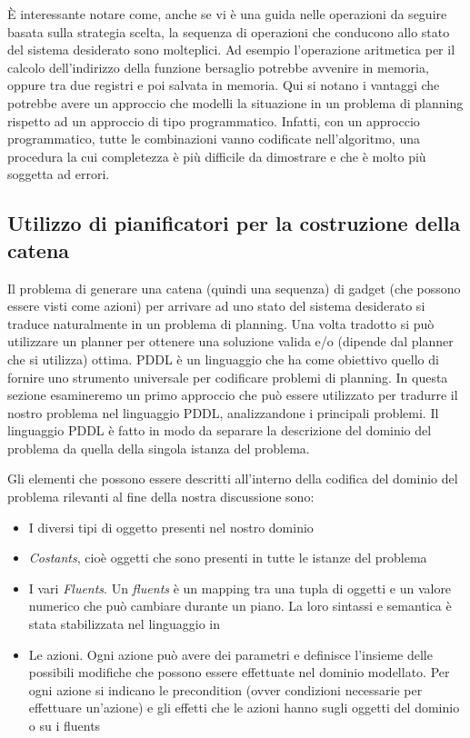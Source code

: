 È interessante notare come, anche se vi è una guida nelle operazioni
da seguire basata sulla strategia scelta, la sequenza di operazioni
che conducono allo stato del sistema desiderato sono molteplici. Ad
esempio l'operazione aritmetica per il calcolo dell'indirizzo della
funzione bersaglio potrebbe avvenire in memoria, oppure tra due
registri e poi salvata in memoria. Qui si notano i vantaggi che
potrebbe avere un approccio che modelli la situazione in un problema
di planning rispetto ad un approccio di tipo programmatico. Infatti,
con un approccio programmatico, tutte le combinazioni vanno codificate
nell'algoritmo, una procedura la cui completezza è più difficile da
dimostrare e che è molto più soggetta ad errori.

\subsection{Utilizzo di pianificatori per la costruzione della
  catena}
\label{sec:pddl}

Il problema di generare una catena (quindi una sequenza) di gadget
(che possono essere visti come azioni) per arrivare ad uno stato del
sistema desiderato si traduce naturalmente in un problema di
planning. Una volta tradotto si può utilizzare un planner per ottenere
una soluzione valida e/o (dipende dal planner che si utilizza)
ottima. PDDL \cite{pddl-97,fox-03} è un linguaggio che ha come
obiettivo quello di fornire uno strumento universale per codificare
problemi di planning. In questa sezione esamineremo un primo approccio
che può essere utilizzato per tradurre il nostro problema nel
linguaggio PDDL, analizzandone i principali problemi. Il linguaggio
PDDL è fatto in modo da separare la descrizione del dominio del
problema da quella della singola istanza del problema. 


Gli elementi che possono essere descritti all'interno della codifica
del dominio del problema rilevanti al fine della nostra discussione sono:
\begin{itemize}
\item I diversi tipi di oggetto presenti nel nostro dominio
\item \emph{Costants}, cioè oggetti che sono presenti in tutte le istanze del problema
\item I vari \emph{Fluents}. Un \emph{fluents} è un mapping tra una
  tupla di oggetti e un valore numerico che può cambiare durante un
  piano. La loro sintassi e semantica è stata stabilizzata nel
  linguaggio in \cite{fox-03}
\item Le azioni. Ogni azione può avere dei parametri e definisce
  l'insieme delle possibili modifiche che possono essere effettuate
  nel dominio modellato. Per ogni azione si indicano le precondition
  (ovver condizioni necessarie per effettuare un'azione) e gli effetti
  che le azioni hanno sugli oggetti del dominio o su i fluents 
\end{itemize}

